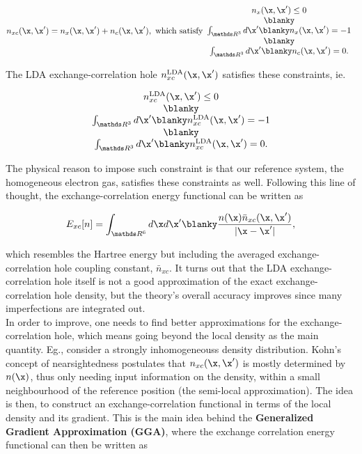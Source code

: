 \documentclass{homework}
\begin{document}
$$
n_{xc}(\x, \x') = n_{x}(\x, \x') + n_{c}(\x, \x'), \textnormal{ which satisfy} \begin{array}{c}
     n_{x}(\x, \x') \leq 0  \\
     \blanky \\
     \int_{\R^{3}} d\x' \blanky n_{x}(\x, \x') = -1\\
     \blanky \\
     \int_{\R^{3}} d\x' \blanky n_{c}(\x, \x') = 0.
\end{array}
$$

The LDA exchange-correlation hole $n_{xc}^{\textnormal{LDA}}(\x,\x')$ satisfies these constraints, ie.

$$
\begin{array}{c}
     n_{xc}^{\textnormal{LDA}}(\x,\x') \leq 0  \\
     \blanky \\
     \int_{\R^{3}} d\x' \blanky n_{xc}^{\textnormal{LDA}}(\x,\x') = -1\\
     \blanky \\
     \int_{\R^{3}} d\x' \blanky n_{xc}^{\textnormal{LDA}}(\x,\x') = 0.
\end{array}
$$

The physical reason to impose such constraint is that our reference system, the homogeneous electron gas, satisfies these constraints as well. Following this line of thought, the exchange-correlation energy functional can be written as 

\begin{equation}
    E_{xc} [n] = \int_{\R^6} d\x d\x' \blanky \frac{n(\x) \bar{n}_{xc}(\x, \x')}{|\x - \x'|},
\end{equation}

which resembles the Hartree energy but including the averaged exchange-correlation hole coupling constant, $\bar n_{xc}$. It turns out that the LDA exchange-correlation hole itself is not a good approximation of the exact exchange-correlation hole density, but the theory's overall accuracy improves since many imperfections are integrated out. \\


In order to improve, one needs to find better approximations for the exchange-correlation hole, which means going beyond the local density as the main quantity. Eg., consider a strongly inhomogeneouss density distribution. Kohn's concept of nearsightedness postulates that $n_{xc}(\x, \x')$ is mostly determined by $n(\x)$, thus only needing input information on the density, within a small neighbourhood of the reference position (the semi-local approximation). The idea is then, to construct an exchange-correlation functional in terms of the local density and its gradient. This is the main idea behind the \textbf{Generalized Gradient Approximation (GGA)}, where the exchange correlation energy functional can then be written as 
\end{document}
